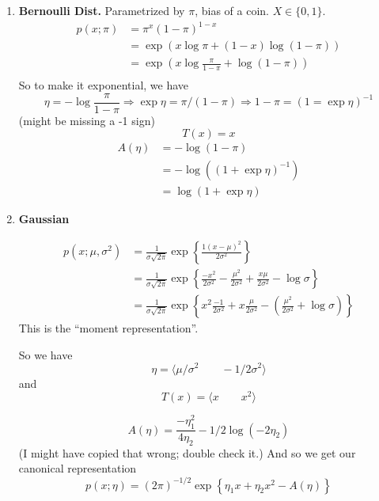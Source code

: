 \documentclass{article}
\newcommand{\inv}{^{-1}}
\begin{document}
\begin{enumerate}
	\item
	\textbf{Bernoulli Dist.}
	Parametrized by $\pi$, bias of a coin. $X\in\{0,1\}$.
	\begin{align}
	p(x;\pi) &= \pi^x (1-\pi)^{1-x} \\
	&= \exp ( x \log \pi + (1-x) \log (1-\pi)) 
	\\
	&= \exp  \left( x \log \frac{\pi}{1-\pi} + \log (1-\pi) \right) 
	\\
	\end{align}
	So to make it exponential, we have
	$$
	\eta = -\log \frac{\pi}{1 - \pi}
	\Rightarrow
	\exp\eta = \pi / (1 - \pi)
	\Rightarrow
	1 - \pi = (1 = \exp\eta)\inv
	$$
	(might be missing a -1 sign)
	$$
	T(x) = x
	$$
	\begin{align*}
	A(\eta) &= - \log(1 - \pi)
	\\
	&= -\log((1 + \exp \eta)\inv)
	\\
	&= \log(1 + \exp \eta)
	\end{align*}
	
	
	
	\item
	\textbf{Gaussian}
	
	
	\begin{align}
	p(x;\mu,\sigma^2) &= 
	\frac{1}{\sigma\sqrt{2\pi}} \exp\left\{  \frac{1(x-\mu)^2}{2\sigma^2}   \right\}
	\\
	&= 
	\frac{1}{\sigma\sqrt{2\pi}} \exp\left\{  
		\frac{-x^2}{2\sigma^2}
		-
		\frac{\mu^2}{2\sigma^2}
		+
		\frac{x\mu}{2\sigma^2}
		-\log\sigma
	\right\}
	\\
	&= 
	\frac{1}{\sigma\sqrt{2\pi}} \exp\left\{  
		x^2\frac{-1}{2\sigma^2}
		+
		x
		\frac{\mu}{2\sigma^2}
		-
		\left(
		\frac{\mu^2}{2\sigma^2}
		+\log\sigma
		\right)
	\right\}
	\end{align}
	This is the ``moment representation''.
	
	So we have
	$$
	\eta = \langle
	\mu/\sigma^2
	\qquad
	-1/2\sigma^2
	 \rangle
	$$
	and
	$$
	T(x) = \langle   x\qquad x^2   \rangle
	$$
	
	$$
	A(\eta) = 
	\frac{-\eta_1^2}
	{4\eta_2}
	-
	1/2 \log(-2\eta_2)
	$$
	(I might have copied that wrong; double check it.)
	And so we get our canonical representation
	$$
	p(x;\eta) = (2\pi)^{-1/2} \exp\left\{   \eta_1 x + \eta_2 x^2  - A(\eta)  \right\}
	$$
	

\end{enumerate}
\end{document}
